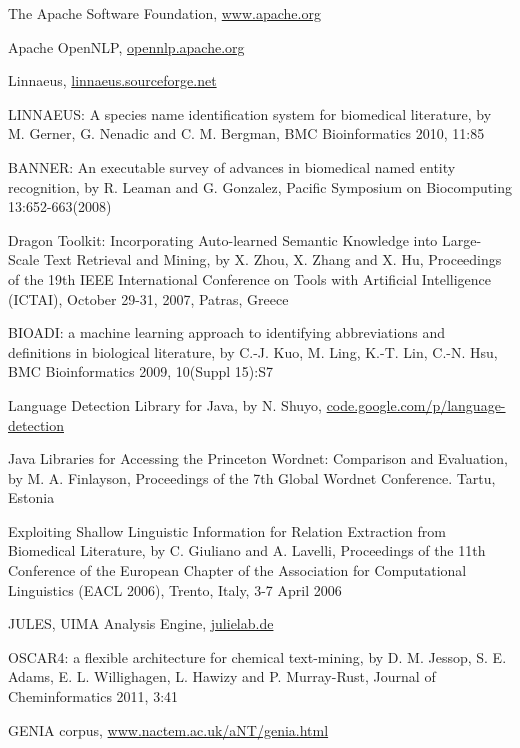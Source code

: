 \documentclass{article}
\begin{document}
\begin{thebibliography}{99}
    The Apache Software Foundation,
    \href{http://www.apache.org/}{www.apache.org}

    Apache OpenNLP,
    \href{https://opennlp.apache.org/}{opennlp.apache.org}

    Linnaeus,
    \href{http://linnaeus.sourceforge.net/}{linnaeus.sourceforge.net}

    LINNAEUS: A species name identification system for biomedical literature,
    by M. Gerner, G. Nenadic and C. M. Bergman,
    BMC Bioinformatics 2010, 11:85

    BANNER: An executable survey of advances in biomedical named entity recognition,
    by R. Leaman and G. Gonzalez,
    Pacific Symposium on Biocomputing 13:652-663(2008)

    Dragon Toolkit: Incorporating Auto-learned Semantic Knowledge into Large-Scale Text Retrieval and Mining,
    by X. Zhou, X. Zhang and X. Hu,
    Proceedings of the 19th IEEE International Conference on Tools with Artificial Intelligence
    (ICTAI), October 29-31, 2007, Patras, Greece

    BIOADI: a machine learning approach to identifying abbreviations and definitions in biological
    literature,
    by C.-J. Kuo, M. Ling, K.-T. Lin, C.-N. Hsu,
    BMC Bioinformatics 2009, 10(Suppl 15):S7

    Language Detection Library for Java,
    by N. Shuyo,
    \href{http://code.google.com/p/language-detection/}{code.google.com/p/language-detection}

    Java Libraries for Accessing the Princeton Wordnet: Comparison and Evaluation,
    by M. A. Finlayson,
    Proceedings of the 7th Global Wordnet Conference. Tartu, Estonia

    Exploiting Shallow Linguistic Information for Relation Extraction from Biomedical Literature,
    by C. Giuliano and A. Lavelli,
    Proceedings of the 11th Conference of the European Chapter of the Association for Computational
    Linguistics (EACL 2006), Trento, Italy, 3-7 April 2006

    JULES, UIMA Analysis Engine,
    \href{http://www.julielab.de/Resources/JCoRe+NLP+Tools/Download/Documentation/UIMA+Analysis+Engine-p-103.html}{julielab.de}

    OSCAR4: a flexible architecture for chemical text-mining,
    by D. M. Jessop, S. E. Adams, E. L. Willighagen, L. Hawizy and P. Murray-Rust,
    Journal of Cheminformatics 2011, 3:41

    GENIA corpus,
    \href{http://www.nactem.ac.uk/aNT/genia.html}{www.nactem.ac.uk/aNT/genia.html}


\end{thebibliography}

\end{document}
